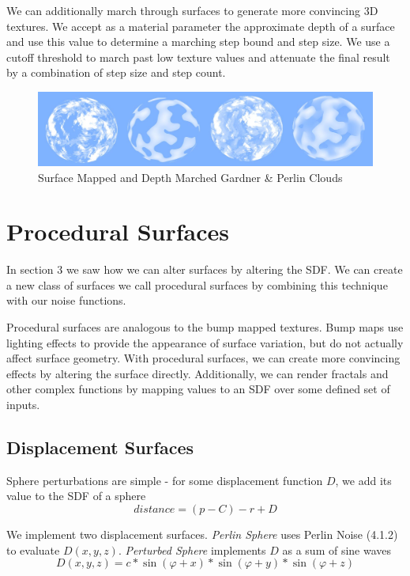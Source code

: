 \documentclass[sigconf, nonacm]{acmart}
\begin{document}
We can additionally march through surfaces to generate more convincing 3D textures. We accept as a material parameter the approximate depth of a surface and use this value to determine a marching step bound and step size. We use a cutoff threshold to march past low texture values and attenuate the final result by a combination of step size and step count.

\begin{figure}[h]
  \centering
  \includegraphics[width=\linewidth]{images/procedural_clouds.jpg}
  \caption{Surface Mapped and Depth Marched Gardner \& Perlin Clouds}
\end{figure}

\section{Procedural Surfaces}

In section 3 we saw how we can alter surfaces by altering the SDF. We can create a new class of surfaces we call procedural surfaces by combining this technique with our noise functions.

Procedural surfaces are analogous to the bump mapped textures. Bump maps use lighting effects to provide the appearance of surface variation, but do not actually affect surface geometry. With procedural surfaces, we can create more convincing effects by altering the surface directly. Additionally, we can render fractals and other complex functions by mapping values to an SDF over some defined set of inputs.

\subsection{Displacement Surfaces}

Sphere perturbations are simple - for some displacement function $D$, we add its value to the SDF of a sphere
$$
distance = (p - C) - r + D
$$

We implement two displacement surfaces. \textit{Perlin Sphere} uses Perlin Noise (4.1.2) to evaluate $D(x,y,z)$. \textit{Perturbed Sphere} implements $D$ as a sum of sine waves
$$
D(x,y,z) = c*\sin(\varphi + x)*\sin(\varphi + y)*\sin(\varphi + z)
$$
\end{document}
